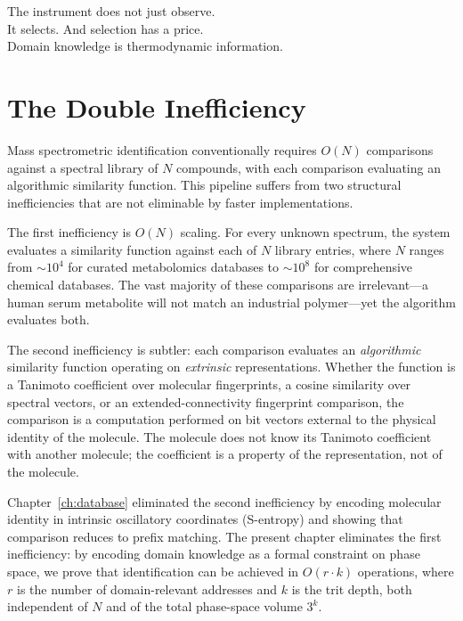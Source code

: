 
\epigraph{%
  The instrument does not just observe.\\
  It selects.  And selection has a price.\\
  Domain knowledge is thermodynamic information.%
}{}

\section{The Double Inefficiency}
\label{sec:ch24-inefficiency}

Mass spectrometric identification conventionally requires $O(N)$ comparisons
against a spectral library of $N$ compounds, with each comparison evaluating
an algorithmic similarity function.  This pipeline suffers from two
structural inefficiencies that are not eliminable by faster implementations.

The first inefficiency is $O(N)$ scaling.  For every unknown spectrum, the
system evaluates a similarity function against each of $N$ library entries,
where $N$ ranges from $\sim 10^4$ for curated metabolomics databases to
$\sim 10^8$ for comprehensive chemical databases.  The vast majority of these
comparisons are irrelevant---a human serum metabolite will not match an
industrial polymer---yet the algorithm evaluates both.

The second inefficiency is subtler: each comparison evaluates an
\emph{algorithmic} similarity function operating on \emph{extrinsic}
representations.  Whether the function is a Tanimoto coefficient over
molecular fingerprints, a cosine similarity over spectral vectors, or an
extended-connectivity fingerprint comparison, the comparison is a computation
performed on bit vectors external to the physical identity of the molecule.
The molecule does not know its Tanimoto coefficient with another molecule; the
coefficient is a property of the representation, not of the molecule.

Chapter~\ref{ch:database} eliminated the second inefficiency by encoding
molecular identity in intrinsic oscillatory coordinates (S-entropy) and
showing that comparison reduces to prefix matching.  The present chapter
eliminates the first inefficiency: by encoding domain knowledge as a formal
constraint on phase space, we prove that identification can be achieved in
$O(r \cdot k)$ operations, where $r$ is the number of domain-relevant addresses
and $k$ is the trit depth, both independent of $N$ and of the total phase-space
volume $3^k$.

